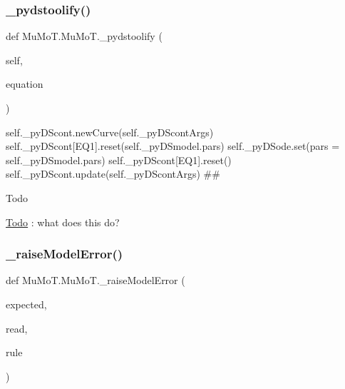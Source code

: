 \subsubsection{\texorpdfstring{\+\_\+pydstoolify()}{\_pydstoolify()}}
{\footnotesize\ttfamily def Mu\+Mo\+T.\+Mu\+Mo\+T.\+\_\+pydstoolify (\begin{DoxyParamCaption}\item[{}]{self,  }\item[{}]{equation }\end{DoxyParamCaption})\hspace{0.3cm}{\ttfamily [private]}}



self.\+\_\+py\+D\+Scont.\+new\+Curve(self.\+\_\+py\+D\+Scont\+Args) self.\+\_\+py\+D\+Scont\mbox{[}\textquotesingle{}E\+Q1\textquotesingle{}\mbox{]}.reset(self.\+\_\+py\+D\+Smodel.\+pars) self.\+\_\+py\+D\+Sode.\+set(pars = self.\+\_\+py\+D\+Smodel.\+pars) self.\+\_\+py\+D\+Scont\mbox{[}\textquotesingle{}E\+Q1\textquotesingle{}\mbox{]}.reset() self.\+\_\+py\+D\+Scont.\+update(self.\+\_\+py\+D\+Scont\+Args) \#\# 

\begin{DoxyRefDesc}{Todo}
\item[\hyperlink{todo__todo000001}{Todo}]\+: what does this do? \end{DoxyRefDesc}
\mbox{\label{namespace_mu_mo_t_1_1_mu_mo_t_a63a6213e268cff48055b330d7dd9e272}} 
\subsubsection{\texorpdfstring{\+\_\+raise\+Model\+Error()}{\_raiseModelError()}}
{\footnotesize\ttfamily def Mu\+Mo\+T.\+Mu\+Mo\+T.\+\_\+raise\+Model\+Error (\begin{DoxyParamCaption}\item[{}]{expected,  }\item[{}]{read,  }\item[{}]{rule }\end{DoxyParamCaption})\hspace{0.3cm}{\ttfamily [private]}}

\mbox{\label{namespace_mu_mo_t_1_1_mu_mo_t_a8a03b36c690f28169c5c116d8e06116f}} 
